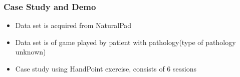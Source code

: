 \documentclass[xcolor=table]{beamer}
\begin{document}
\begin{frame}
\frametitle{Case Study and Demo}
\begin{itemize}
\item Data set is acquired from NaturalPad
\item Data set is of game played by patient with pathology(type of pathology unknown)
\item Case study using HandPoint exercise, consists of 6 sessions
\end{itemize}

\end{frame}
\end{document}
